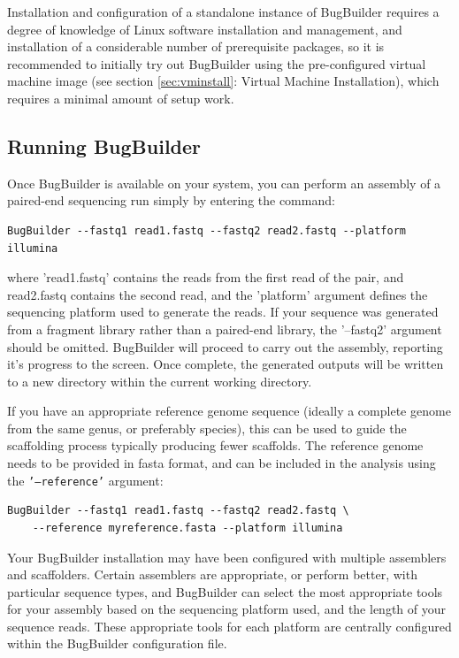 \documentclass[a4paper,10pt]{article}
\begin{document}
Installation and configuration of a standalone instance of BugBuilder requires
a degree of knowledge of Linux software installation and management, and
installation of a considerable number of prerequisite packages, so it is
recommended to initially try out BugBuilder using the pre-configured virtual
machine image (see section \ref{sec:vminstall}: Virtual Machine Installation),
which requires a minimal amount of setup work. 

\subsection{Running BugBuilder}

Once BugBuilder is available on your system, you can perform an assembly of a
paired-end sequencing run simply by entering the command:

\begin{verbatim}
BugBuilder --fastq1 read1.fastq --fastq2 read2.fastq --platform illumina
\end{verbatim}

where 'read1.fastq' contains the reads from the first read of the pair, and
read2.fastq contains the second read, and the 'platform' argument defines the
sequencing platform used to generate the reads. If your sequence was generated
from a fragment library rather than a paired-end library, the '--fastq2'
argument should be omitted.  BugBuilder will proceed to carry out the assembly,
reporting it's progress to the screen. Once complete, the generated outputs
will be written to a new directory within the current working directory. 

If you have an appropriate reference genome sequence (ideally a complete genome
from the same genus, or preferably species), this can be used to guide the
scaffolding process typically producing fewer scaffolds. The reference genome
needs to be provided in fasta format, and can be included in the analysis using
the {\tt '--reference'} argument:

\begin{verbatim}
BugBuilder --fastq1 read1.fastq --fastq2 read2.fastq \
    --reference myreference.fasta --platform illumina
\end{verbatim}


Your BugBuilder installation may have been configured with multiple assemblers
and scaffolders.  Certain assemblers are appropriate, or perform better, with
particular sequence types, and BugBuilder can select the most appropriate
tools for your assembly based on the sequencing platform used, and the length
of your sequence reads.  These appropriate tools for each platform are
centrally configured within the BugBuilder configuration file.  
\end{document}
